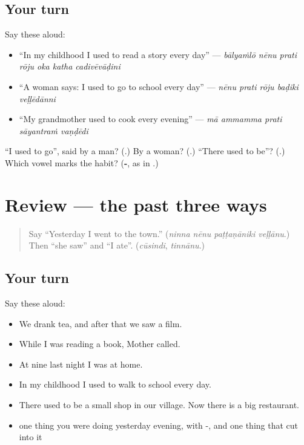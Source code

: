 \subsection*{Your turn}
Say these aloud:

\begin{itemize}
\raggedright
  \item \textquotedblleft{}In my childhood I used to read a story every day\textquotedblright{} — \emph{bālyaṁlō nēnu prati rōju oka katha cadivēvāḍini}
  \item \textquotedblleft{}A woman says: I used to go to school every day\textquotedblright{} — \emph{nēnu prati rōju baḍiki veḷḷēdānni}
  \item \textquotedblleft{}My grandmother used to cook every evening\textquotedblright{} — \emph{mā ammamma prati sāyantraṁ vaṇḍēdi}
\end{itemize}

\begin{tcolorbox}[breakable,colback=teal!4,colframe=teal!35!black,title={Before you move on}]
\textquotedblleft{}I used to go\textquotedblright{}, said by a man? (\textbf{}.) By a woman? (\textbf{}.) \textquotedblleft{}There used to be\textquotedblright{}? (\textbf{}.) Which vowel marks the habit? (\textbf{-}, as in \textbf{}.)
\end{tcolorbox}
\section[(review)]{Review — the past three ways}

\label{lesson:TE-R316-the-past-three-ways}



\begin{quote}
Say \textquotedblleft{}Yesterday I went to the town.\textquotedblright{} (\emph{ninna nēnu paṭṭaṇāniki veḷḷānu}.) Then \textquotedblleft{}she saw\textquotedblright{} and \textquotedblleft{}I ate\textquotedblright{}. (\emph{cūsindi}, \emph{tinnānu}.)
\end{quote}

\subsection*{Your turn}
Say these aloud:

\begin{itemize}
\raggedright
  \item We drank tea, and after that we saw a film.
  \item While I was reading a book, Mother called.
  \item At nine last night I was at home.
  \item In my childhood I used to walk to school every day.
  \item There used to be a small shop in our village. Now there is a big restaurant.
  \item one thing you were doing yesterday evening, with -, and one thing that cut into it
\end{itemize}

